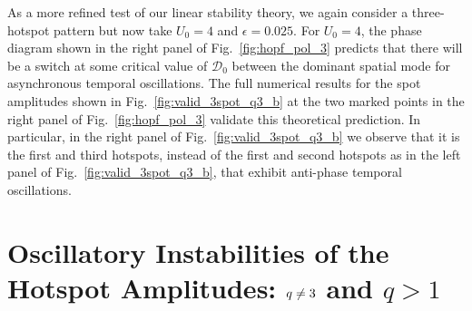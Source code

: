 \documentclass{article}%
\begin{document}
As a more refined test of our linear stability theory, we again
consider a three-hotspot pattern but now take $U_0=4$ and
$\epsilon=0.025$. For $U_0=4$, the phase diagram shown in the right
panel of Fig.~\ref{fig:hopf_pol_3} predicts that there will be a
switch at some critical value of ${\mathcal D}_0$ between the dominant
spatial mode for asynchronous temporal oscillations. The full
numerical results for the spot amplitudes shown in
Fig.~\ref{fig:valid_3spot_q3_b} at the two marked points in the right
panel of Fig.~\ref{fig:hopf_pol_3} validate this theoretical
prediction. In particular, in the right panel of
Fig.~\ref{fig:valid_3spot_q3_b} we observe that it is the first and
third hotspots, instead of the first and second hotspots as in the
left panel of Fig.~\ref{fig:valid_3spot_q3_b}, that exhibit anti-phase
temporal oscillations.

\setcounter{equation}{0}
\setcounter{section}{5}
\section{Oscillatory Instabilities of the Hotspot Amplitudes: $q\protect\neq3$
and $q>1$}\label{sec:stab_qn3}
\end{document}
